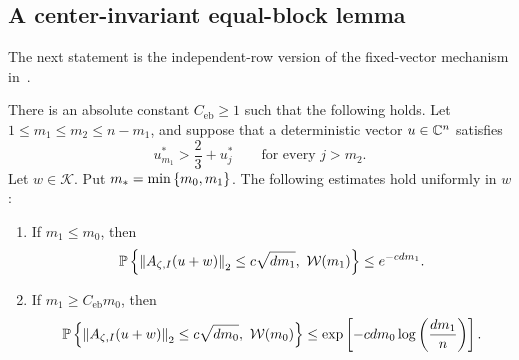 \subsection{A center-invariant equal-block lemma}

The next statement is the independent-row version of the fixed-vector mechanism in~\cite[Section~4.3]{LLTTY19}.

\begin{lemma}\label{lem:equal-block}
There is an absolute constant $C_{\mathrm{eb}}\ge1$ such that the following holds. Let $1\le m_1\le m_2\le n-m_1$, and suppose that a deterministic vector $u\in\mathbb C^n$ satisfies
\begin{equation}\label{eq:equal-block-separation}
  u_{m_1}^*>\frac23+u_j^*
  \qquad\text{for every }j>m_2.
\end{equation}
Let $w\in\mathcal K$. Put $m_*=\min\left\{m_0,m_1\right\}$. The following estimates hold uniformly in $w$:
\begin{enumerate}[label=\textup{(\roman*)}]
\item If $m_1\le m_0$, then
\begin{equation}\label{eq:equal-block-small}
  \mathbb P\left\{\left\|A_{\zeta,I}(u+w)\right\|_2\le c\sqrt{dm_1},\ \mathcal W(m_1)\right\}
  \le e^{-cdm_1}.
\end{equation}
\item If $m_1\ge C_{\mathrm{eb}}m_0$, then
\begin{equation}\label{eq:equal-block-large}
  \mathbb P\left\{\left\|A_{\zeta,I}(u+w)\right\|_2\le c\sqrt{dm_0},\ \mathcal W(m_0)\right\}
  \le\exp\left[-cdm_0\log\left(\frac{dm_1}{n}\right)\right].
\end{equation}
\end{enumerate}
\end{lemma}

